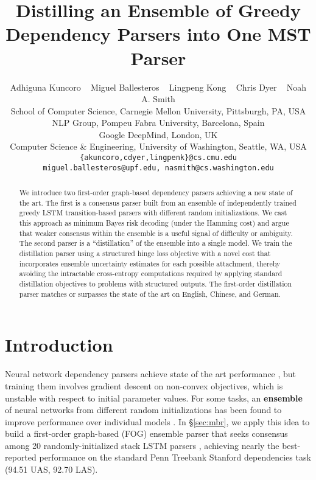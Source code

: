 \documentclass[11pt,letterpaper]{article}
\title{Distilling an Ensemble of Greedy Dependency Parsers into One MST Parser}
\author{Adhiguna Kuncoro ~ Miguel Ballesteros  ~ Lingpeng Kong  ~ Chris Dyer ~ Noah A. Smith \\
School of Computer Science, Carnegie Mellon University, Pittsburgh, PA, USA \\
NLP Group, Pompeu Fabra University, Barcelona, Spain \\
Google DeepMind, London, UK\\
Computer Science \& Engineering, University of Washington, Seattle, WA, USA\\
{\small \tt \{akuncoro,cdyer,lingpenk\}@cs.cmu.edu}\\ {\small \tt miguel.ballesteros@upf.edu, nasmith@cs.washington.edu}
}
\date{}
\newcommand{\ignore}[1]{}
\newcommand{\cjd}[1]{\textcolor{cyan}{\ignore{{\textbf{[#1 --\textsc{cjd}]}}}}}
\begin{document}
\maketitle

\begin{abstract}
We introduce two first-order graph-based dependency parsers achieving a new state of the art. The first is a consensus parser built from an ensemble of independently trained greedy LSTM transition-based parsers with different random initializations. We cast this approach as minimum Bayes risk decoding (under the Hamming cost) and argue that weaker consensus within the ensemble is a useful signal of difficulty or ambiguity. The second parser is a ``distillation'' of the ensemble into a single model. We train the distillation parser using a structured hinge loss objective with a novel cost that incorporates ensemble uncertainty estimates for each possible attachment, thereby avoiding the intractable cross-entropy computations required by applying standard distillation objectives to problems with structured outputs.\ignore{\cjd{Rather than giving the accuracies here, I think I'd prefer to say something about the distillation cost objective: maybe, it is ``the Hamming cost discounted by the posterior (or `ensemble'?) attachment uncertainty estimated from the ensemble of predictions.'' No one outside of parsing will remember or care about our numbers, people might care about this idea. I think including the parsing numbers makes us seem parochial, and this is a more interesting paper.}}
The first-order distillation parser matches or surpasses the state of the art on English, Chinese, and German. 
\end{abstract}
\section{Introduction}


Neural network dependency parsers achieve  state of the art performance
\cite{stack_lstm,structured_training,globally_normalized}, but training them
involves gradient descent on non-convex objectives, which is unstable with respect to initial parameter values.  For some tasks, an \textbf{ensemble} of neural networks from different random initializations has been found to improve performance over individual models \cite[\emph{inter alia}]{seq_to_seq,grammar_foreign}.  In \S\ref{sec:mbr}, we apply this idea to build a first-order graph-based (FOG) ensemble parser \cite{ensemble_reparsing} that seeks consensus among 20 randomly-initialized stack LSTM parsers \cite{stack_lstm}, achieving nearly the best-reported performance on the standard Penn Treebank Stanford dependencies task (94.51 UAS, 92.70 LAS).
\end{document}

